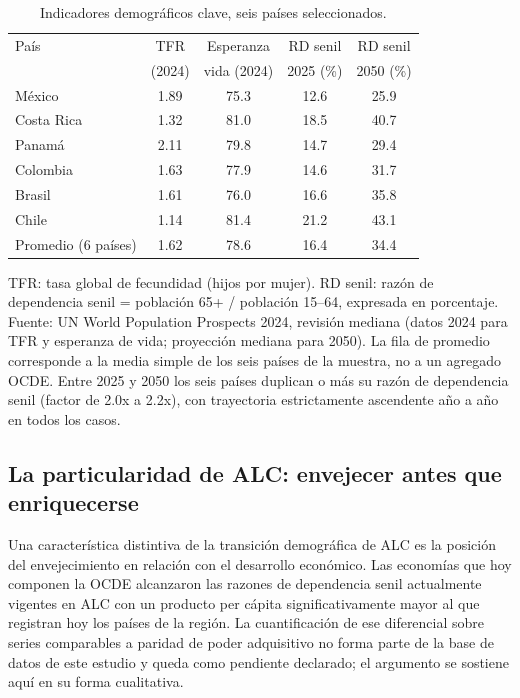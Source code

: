 \documentclass[12pt, letterpaper]{article}
\begin{document}
\begin{table}[h!]
\centering
\caption{Indicadores demográficos clave, seis países seleccionados.}
\label{tab:demog}
\small
\begin{tabular}{lcccc}
\toprule
País & TFR & Esperanza & RD senil & RD senil \\
     & (2024) & vida (2024) & 2025 (\%) & 2050 (\%) \\
\midrule
México       & 1.89 & 75.3 & 12.6 & 25.9 \\
Costa Rica   & 1.32 & 81.0 & 18.5 & 40.7 \\
Panamá       & 2.11 & 79.8 & 14.7 & 29.4 \\
Colombia     & 1.63 & 77.9 & 14.6 & 31.7 \\
Brasil       & 1.61 & 76.0 & 16.6 & 35.8 \\
Chile        & 1.14 & 81.4 & 21.2 & 43.1 \\
\midrule
Promedio (6 países) & 1.62 & 78.6 & 16.4 & 34.4 \\
\bottomrule
\end{tabular}

\smallskip
\footnotesize
TFR: tasa global de fecundidad (hijos por mujer). RD senil: razón de dependencia
senil = población 65+ / población 15--64, expresada en porcentaje. Fuente: UN World
Population Prospects 2024, revisión mediana (datos 2024 para TFR y esperanza de vida;
proyección mediana para 2050). La fila de promedio corresponde a la media simple de
los seis países de la muestra, no a un agregado OCDE. Entre 2025 y 2050 los seis
países duplican o más su razón de dependencia senil (factor de 2.0x a 2.2x), con
trayectoria estrictamente ascendente año a año en todos los casos.
\end{table}

\subsection{La particularidad de ALC: envejecer antes que enriquecerse}
\label{sec:envejecer-antes}

Una característica distintiva de la transición demográfica de ALC es la posición
del envejecimiento en relación con el desarrollo económico. Las economías que hoy
componen la OCDE alcanzaron las razones de dependencia senil actualmente vigentes
en ALC con un producto per cápita significativamente mayor al que registran hoy
los países de la región. La cuantificación de ese diferencial sobre series
comparables a paridad de poder adquisitivo no forma parte de la base de datos de
este estudio y queda como pendiente declarado; el argumento se sostiene aquí en su
forma cualitativa.
\end{document}
